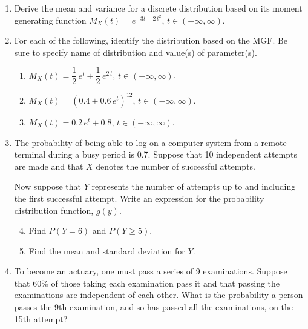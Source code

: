 \documentclass[12pt]{article}
\begin{document}
\begin{enumerate}
  \item Derive the mean and variance for a discrete distribution based on its moment generating function $M_X(t) = e^{-3t + 2\,t^2}$, $t \in (-\infty, \infty)$.

\newpage

  \item For each of the following, identify the distribution based on the MGF. Be sure to specify name of distribution and value(s) of parameter(s).
    \begin{enumerate}[label=(\alph*)]
      \item $M_X(t) = \dfrac{1}{2}\,e^{t} + \dfrac{1}{2}\,e^{2\,t}$, $t \in (-\infty, \infty)$.
      \item $M_X(t) = (0.4 + 0.6\,e^{t})^{12}$, $t \in (-\infty, \infty)$.
      \item $M_X(t) = 0.2\,e^{t} + 0.8$, $t \in (-\infty, \infty)$.
    \end{enumerate}

\newpage

  \item The probability of being able to log on a computer system from a remote terminal during a busy period is 0.7. Suppose that 10 independent attempts are made and that $X$ denotes the number of successful attempts.

    Now suppose that $Y$ represents the number of attempts up to and including the first successful attempt. Write an expression for the probability distribution function, $g(y)$.
    \begin{enumerate}[label=(\alph*)]
      \setcounter{enumii}{3}
      \item Find $P(Y = 6)$ and $P(Y \ge 5)$.
      \item Find the mean and standard deviation for $Y$.
    \end{enumerate}

\newpage

  \item To become an actuary, one must pass a series of 9 examinations. Suppose that 60\% of those taking each examination pass it and that passing the examinations are independent of each other. What is the probability a person passes the 9th examination, and so has passed all the examinations, on the 15th attempt?

\newpage

\end{enumerate}
\end{document}
